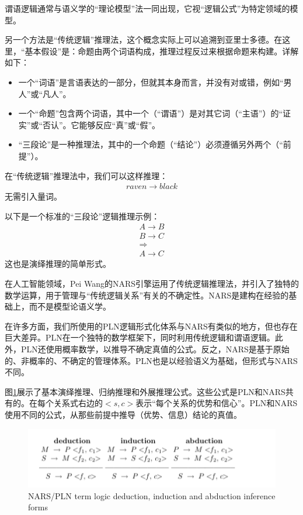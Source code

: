 谓语逻辑通常与语义学的“理论模型”法一同出现，它视“逻辑公式”为特定领域的模型\cite{Muller2009}。


另一个方法是“传统逻辑”推理法，这个概念实际上可以追溯到亚里士多德。在这里，“基本假设”是：命题由两个词语构成，推理过程反过来根据命题来构建。详解如下：

\begin{itemize}
\item 一个“词语”是言语表达的一部分，但就其本身而言，并没有对或错，例如“男人”或“凡人”。
\item 一个“命题”包含两个词语，其中一个（“谓语”）是对其它词（“主语”）的“证实”或“否认”。它能够反应“真”或“假”。
\item “三段论”是一种推理法，其中的一个命题（“结论”）必须遵循另外两个（“前提”）。
\end{itemize}

在“传统逻辑”推理法中，我们可以这样推理：
\begin{eqnarray*}
raven \rightarrow black
\end{eqnarray*}
无需引入量词。

以下是一个标准的“三段论”逻辑推理示例：
\begin{eqnarray*}
A \rightarrow B \\
B \rightarrow C \\
\Rightarrow \\
A \rightarrow C
\end{eqnarray*}
这也是演绎推理的简单形式。

在人工智能领域，Pei Wang的NARS引擎运用了传统逻辑推理法\cite{Wang2006}，并引入了独特的数学运算，用于管理与“传统逻辑关系”有关的不确定性。NARS是建构在经验的基础上，而不是模型论语义学。

在许多方面，我们所使用的PLN逻辑形式化体系与NARS有类似的地方，但也存在巨大差异。PLN在一个独特的数学框架下，同时利用传统逻辑和谓语逻辑。此外，PLN还使用概率数学，以推导不确定真值的公式。反之，NARS是基于原始的、非概率的、不确定的管理体系。PLN也是以经验语义为基础，但形式与NARS不同。


图\ref{fig:nars}展示了基本演绎推理、归纳推理和外展推理公式。这些公式是PLN和NARS共有的。在每个关系式右边的$<s,c>$表示“每个关系的优势和信心”。PLN和NARS使用不同的公式，从那些前提中推导（优势、信息）结论的真值。

\begin{figure}[htb]
\centering
\includegraphics[width=12cm]{figures/nars.png}
\caption{ NARS/PLN term logic deduction, induction and abduction inference forms }
\label{fig:nars}
\end{figure}

